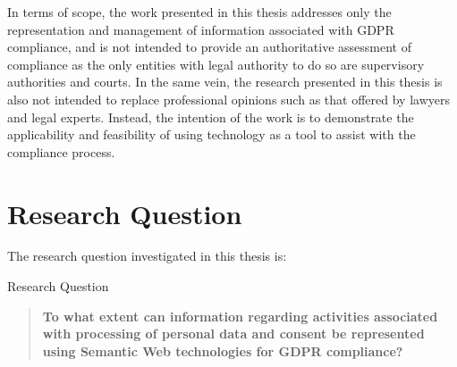 In terms of scope, the work presented in this thesis addresses only the representation and management of information associated with GDPR compliance, and is not intended to provide an authoritative assessment of  compliance as the only entities with legal authority to do so are supervisory authorities and courts.
In the same vein, the research presented in this thesis is also not intended to replace professional opinions such as that offered by lawyers and legal experts.
Instead, the intention of the work is to demonstrate the applicability and feasibility of using technology as a tool to assist with the compliance process.

\section{Research Question}\label{sec:intro:RQ}
The research question investigated in this thesis is:
\begin{framed}
\small{Research Question}
\begin{quote}
\textbf{To what extent can information regarding activities associated with processing of personal data and consent be represented using Semantic Web technologies for GDPR compliance?}
\end{quote}
\end{framed}

